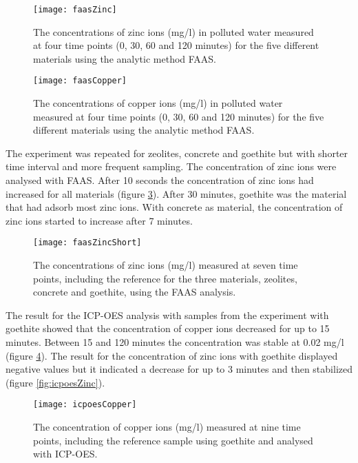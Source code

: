 \begin{figure}[H]
    \centering
    \texttt{[image: faasZinc]}
    \caption{The concentrations of zinc ions (mg/l) in polluted water measured at four time points (0, 30, 60 and 120 minutes) for the five different materials using the analytic method FAAS.}
	\label{fig:faasZinc}
\end{figure}


\begin{figure}[H]
    \centering
    \texttt{[image: faasCopper]}
    \caption{The concentrations of copper ions (mg/l) in polluted water measured at four time points (0, 30, 60 and 120 minutes) for the five different materials using the analytic method FAAS.}
	\label{fig:faasCopper}
\end{figure}

The experiment was repeated for zeolites, concrete and goethite but with shorter time interval and more frequent sampling. The concentration of zinc ions were analysed with FAAS. After 10 seconds the concentration of zinc ions had increased for all materials (figure \ref{fig:faasZincShort}). After 30 minutes, goethite was the material that had adsorb most zinc ions. With concrete as material, the concentration of zinc ions started to increase after 7 minutes.


\begin{figure}[H]
    \centering
    \texttt{[image: faasZincShort]}
    \caption{The concentrations of zinc ions (mg/l) measured at seven time points, including the reference for the three materials, zeolites, concrete and goethite, using the FAAS analysis.}
	\label{fig:faasZincShort}
\end{figure}

The result for the ICP-OES analysis with samples from the experiment with goethite showed that the concentration of copper ions decreased for up to 15 minutes. Between 15 and 120 minutes the concentration was stable at 0.02 mg/l (figure \ref{fig:icpoesCopper}). The result for the concentration of zinc ions with goethite displayed negative values but it indicated a decrease for up to 3 minutes and then stabilized (figure \ref{fig:icpoesZinc}).

\begin{figure}[H]
    \centering
    \texttt{[image: icpoesCopper]}
    \caption{The concentration of copper ions (mg/l) measured at nine time points, including the reference sample using goethite and analysed with ICP-OES.}	\label{fig:icpoesCopper}
\end{figure}



